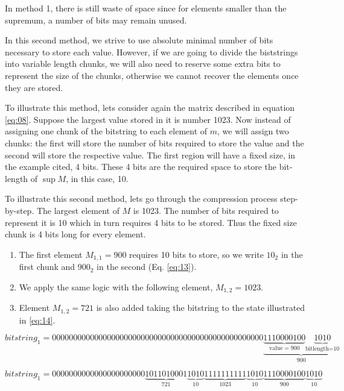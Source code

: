 \documentclass[10pt]{article}
\begin{document}
In method 1, there is still waste of space since for elements smaller than the supremum, a number of bits may remain unused.

In this second method, we strive to use absolute minimal number of bits necessary to store each value. However, if we are going to divide the biststrings into variable length chunks, we will also need to reserve some extra bits to represent the size of the chunks, otherwise we cannot recover the elements once they are stored.

To illustrate this method, lets consider again the matrix described in equation \ref{eq:08}. Suppose the largest value stored in it is number 1023. Now instead of assigning one chunk of the bitstring to each element of $m$, we will assign two chunks: the first will store the number of bits required to store the value and the second  will store the respective value. The first region will have a fixed size, in the example cited, 4 bits. These 4 bits are the required space to store the bit-length of $\sup M $, in this case, 10. 

To illustrate this second method, lets go through the compression process step-by-step. The largest element of $M$ is 1023. The number of bits required to represent it is 10 which in turn requires 4 bits to be stored. Thus the fixed size chunk is 4 bits long for every element.

\begin{enumerate}
 \item The first element $M_{1,1}=900$ requires 10 bits to store, so we write $10_2$ in the first chunk and $900_2$ in the second (Eq. \ref{eq:13}).
 \item We apply the same logic with the following element, $M_{1,2}=1023$.
 \item Element $M_{1,2}=721$ is also added taking the bitstring to the state illustrated in \ref{eq:14}.
\end{enumerate}

\begin{equation} \label{eq:13}
 bitstring_1 = 00000000000000000000000000000000000000000000000000\underbrace{\underbrace{1110000100}_{\text{value} = 900}\underbrace{1010}_{\text{bitlength=10}}}_{900}
\end{equation}

\begin{equation} \label{eq:14}
 bitstring_1 = 
 0000000000000000000000\underbrace{1011010001}_{721}\underbrace{1010}_{10}\underbrace{1111111111}_{1023}\underbrace{1010}_{10}\underbrace{1110000100}_{900}\underbrace{1010}_{10}
\end{equation}
\end{document}
